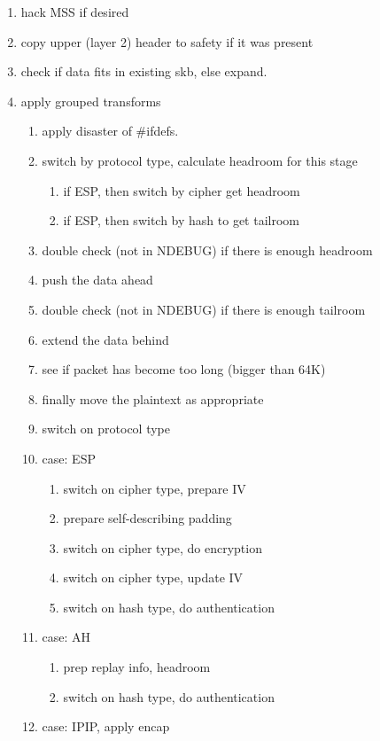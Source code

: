 \begin{enumerate}
\begin{enumerate}
		\item hack MSS if desired

		\item copy upper (layer 2) header to safety if it was present

		\item check if data fits in existing skb, else expand.
		\item apply grouped transforms
		\begin{enumerate}
			\item apply disaster of \#ifdefs.
			\item switch by protocol type, calculate headroom for this stage
			\begin{enumerate}
				\item if ESP, then switch by cipher get headroom
				\item if ESP, then switch by hash to get tailroom
			\end{enumerate}
			\item double check (not in NDEBUG) if there is enough headroom
			\item push the data ahead
			\item double check (not in NDEBUG) if there is enough tailroom
			\item extend the data behind
			\item see if packet has become too long (bigger than 64K)
			\item finally move the plaintext as appropriate
			\item switch on protocol type
			\item case: ESP
			\begin{enumerate}
				\item switch on cipher type, prepare IV
				\item prepare self-describing padding
				\item switch on cipher type, do encryption
				\item switch on cipher type, update IV
				\item switch on hash type, do authentication
			\end{enumerate}
			\item case: AH
			\begin{enumerate}
				\item prep replay info, headroom
				\item switch on hash type, do authentication
			\end{enumerate}
			\item case: IPIP, apply encap

\end{enumerate}
\end{enumerate}
\end{enumerate}
